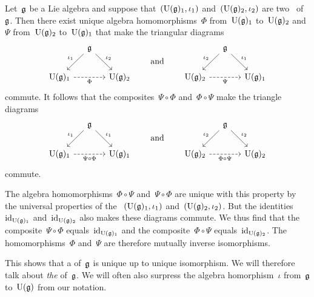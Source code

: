 \begin{remark}
  \label{uniqueness of universal enveloping algebras}
  Let~$\mathfrak{g}$ be a Lie algebra and suppose that~$(\operatorname{U}(\mathfrak{g})_1, \iota_1)$ and~$(\operatorname{U}(\mathfrak{g})_2, \iota_2)$ are two~{\uas} of~$\mathfrak{g}$.
  Then there exist unique algebra homomorphisms~$\Phi$ from~$\operatorname{U}(\mathfrak{g})_1$ to~$\operatorname{U}(\mathfrak{g})_2$ and~$\Psi$ from~$\operatorname{U}(\mathfrak{g})_2$ to~$\operatorname{U}(\mathfrak{g})_1$ that make the triangular diagrams
  \[
    \begin{tikzcd}[column sep = small]
      {}
      &
      \glie
      \arrow{dl}[above left]{\iota_1}
      \arrow{dr}[above right]{\iota_2}
      &
      {}
      \\
      \Univ(\glie)_1
      \arrow[dashed]{rr}[below]{\Phi}
      &
      {}
      &
      \Univ(\glie)_2
    \end{tikzcd}
    \qquad\text{and}\qquad
    \begin{tikzcd}[column sep = small]
      {}
      &
      \glie
      \arrow{dl}[above left]{\iota_2}
      \arrow{dr}[above right]{\iota_1}
      &
      {}
      \\
      \Univ(\glie)_2
      \arrow[dashed]{rr}[below]{\Psi}
      &
      {}
      &
      \Univ(\glie)_1
    \end{tikzcd}
  \]
  commute.
  It follows that the composites~$\Psi \circ \Phi$ and~$\Phi \circ \Psi$ make the triangle diagrams
  \[
    \begin{tikzcd}[column sep = small]
      {}
      &
      \glie
      \arrow{dl}[above left]{\iota_1}
      \arrow{dr}[above right]{\iota_1}
      &
      {}
      \\
      \Univ(\glie)_1
      \arrow[dashed]{rr}[below]{\Psi \circ \Phi}
      &
      {}
      &
      \Univ(\glie)_1
    \end{tikzcd}
    \qquad\text{and}\qquad
    \begin{tikzcd}[column sep = small]
      {}
      &
      \glie
      \arrow{dl}[above left]{\iota_2}
      \arrow{dr}[above right]{\iota_2}
      &
      {}
      \\
      \Univ(\glie)_2
      \arrow[dashed]{rr}[below]{\Phi \circ \Psi}
      &
      {}
      &
      \Univ(\glie)_2
    \end{tikzcd}
  \]
  commute.

  The algebra homomorphisms~$\Phi \circ \Psi$ and~$\Psi \circ \Phi$ are unique with this property by the universal properties of the {\uas}~$(\operatorname{U}(\mathfrak{g})_1, \iota_1)$ and~$(\operatorname{U}(\mathfrak{g})_2, \iota_2)$.
  But the identities~$\mathrm{id}_{\operatorname{U}(\mathfrak{g})_1}$ and~$\mathrm{id}_{\operatorname{U}(\mathfrak{g})_2}$ also makes these diagrams commute.
  We thus find that the composite~$\Psi \circ \Phi$ equals~$\mathrm{id}_{\operatorname{U}(\mathfrak{g})_1}$ and the composite~$\Phi \circ \Psi$ equals~$\mathrm{id}_{\operatorname{U}(\mathfrak{g})_2}$.
  The homomorphisms~$\Phi$ and~$\Psi$ are therefore mutually inverse isomorphisms.
  
  This shows that a {\ua} of~$\mathfrak{g}$ is unique up to unique isomorphism.
  We will therefore talk about \emph{the} {\ua} of~$\mathfrak{g}$.
  We will often also surpress the algebra homorphism~$\iota$ from~$\mathfrak{g}$ to~$\operatorname{U}(\mathfrak{g})$ from our notation.
\end{remark}



